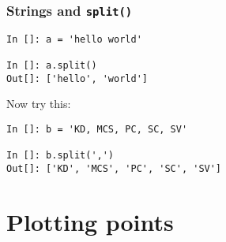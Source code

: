 \documentclass[14pt,compress]{beamer}
\newcounter{time}
\newcommand{\inctime}[1]{\addtocounter{time}{#1}{\tiny \thetime\ m}}
\newcommand{\typ}[1]{\lstinline{#1}}
\begin{document}
\begin{frame}[fragile]\frametitle{Strings and \typ{split()}}
  \begin{lstlisting}
In []: a = 'hello world'

In []: a.split()
Out[]: ['hello', 'world']
  \end{lstlisting}
Now try this:
  \begin{lstlisting}
In []: b = 'KD, MCS, PC, SC, SV'

In []: b.split(',')
Out[]: ['KD', 'MCS', 'PC', 'SC', 'SV']
  \end{lstlisting}
\inctime{5}
\end{frame}

\section{Plotting points}
\end{document}
